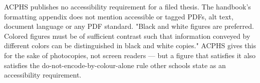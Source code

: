 


	{ACPHS publishes no accessibility requirement for a filed thesis. The
	 handbook's formatting appendix does not mention accessible or tagged PDFs,
	 alt text, document language or any PDF standard.}
	{"Black and white figures are preferred. Colored figures must be of
	 sufficient contrast such that information conveyed by different colors can
	 be distinguished in black and white copies." ACPHS gives this for the sake
	 of photocopies, not screen readers — but a figure that satisfies it also
	 satisfies the do-not-encode-by-colour-alone rule other schools state as an
	 accessibility requirement.}

